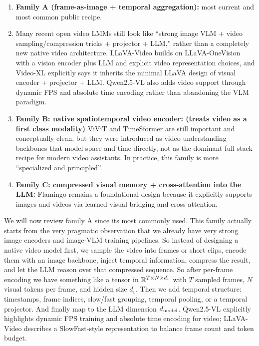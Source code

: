 \documentclass[11pt]{article}  %
\begin{document}
\begin{enumerate}
  \item \textbf{Family A (frame-as-image + temporal aggregation):} most current and most common public recipe.
  \item Many recent open video LMMs still look like ``strong image VLM + video sampling/compression tricks + projector + LLM,'' rather than a completely new native video architecture.
  LLaVA-Video builds on LLaVA-OneVision with a vision encoder plus LLM and explicit video representation choices, and Video-XL explicitly says it inherits the minimal LLaVA design of visual encoder + projector + LLM. Qwen2.5-VL also adds video support through dynamic FPS and absolute time encoding rather than abandoning the VLM paradigm.

  \item \textbf{Family B: native spatiotemporal video encoder: (treats video as a first class modality)} ViViT and TimeSformer are still important and conceptually clean, but they were introduced as video-understanding backbones that model space and time directly, not as the dominant full-stack recipe for modern video assistants. In practice, this family is more ``specialized and principled''.
  
  \item \textbf{Family C: compressed visual memory + cross-attention into the LLM:} Flamingo remains a foundational design because it explicitly supports images and videos via learned visual bridging and cross-attention.
\end{enumerate}

We will now review family A since its most commonly used.
This family actually starts from the very pragmatic observation that we already have very strong image encoders and image-VLM training pipelines.
So instead of designing a native video model first, we sample the video into frames or short clips, encode them with an image backbone, inject temporal information, compress the result, and let the LLM reason over that compressed sequence.
So after per-frame encoding we have something like a tensor in $\mathbb{R}^{T \times N \times d_v}$ with $T$ sampled frames, $N$ visual tokens per frame, and hidden size $d_v$.
Then we add temporal structure: timestamps, frame indices, slow/fast grouping, temporal pooling, or a temporal projector.
And finally map to the LLM dimension $d_{\text{model}}$.
Qwen2.5-VL explicitly highlights dynamic FPS training and absolute time encoding for video; LLaVA-Video describes a SlowFast-style representation to balance frame count and token budget.
\end{document}
